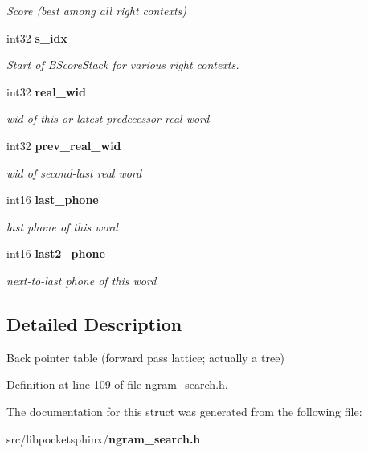 \begin{DoxyCompactItemize}
\begin{DoxyCompactList}\small\item\em Score (best among all right contexts) \end{DoxyCompactList}\item 
int32 {\bf s\-\_\-idx}\label{structbptbl__s_abf9e4bcf1927aa09fb2b30c59e99f551}

\begin{DoxyCompactList}\small\item\em Start of B\-Score\-Stack for various right contexts. \end{DoxyCompactList}\item 
int32 {\bf real\-\_\-wid}\label{structbptbl__s_a91247e4f807cf780afe8f5ac45e720b8}

\begin{DoxyCompactList}\small\item\em wid of this or latest predecessor real word \end{DoxyCompactList}\item 
int32 {\bf prev\-\_\-real\-\_\-wid}\label{structbptbl__s_a83784e3b0121bc365d485151ab277920}

\begin{DoxyCompactList}\small\item\em wid of second-\/last real word \end{DoxyCompactList}\item 
int16 {\bf last\-\_\-phone}\label{structbptbl__s_aa7704ba76d3dcde6b8a24855362a4289}

\begin{DoxyCompactList}\small\item\em last phone of this word \end{DoxyCompactList}\item 
int16 {\bf last2\-\_\-phone}\label{structbptbl__s_a27b8e54bb7552e6afc15e4f44f42e3b7}

\begin{DoxyCompactList}\small\item\em next-\/to-\/last phone of this word \end{DoxyCompactList}\end{DoxyCompactItemize}


\subsection{Detailed Description}
Back pointer table (forward pass lattice; actually a tree) 

Definition at line 109 of file ngram\-\_\-search.\-h.



The documentation for this struct was generated from the following file\-:\begin{DoxyCompactItemize}
\item 
src/libpocketsphinx/{\bf ngram\-\_\-search.\-h}\end{DoxyCompactItemize}
